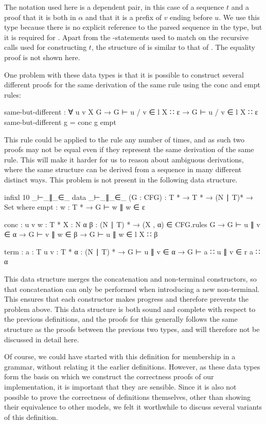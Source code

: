 	The  notation used here is a dependent pair, in this
	case of a sequence $t$ and a proof that it is both in $\alpha$ and that it
	is a prefix of $v$ ending before $u$. We use this type because there is no
	explicit reference to the parsed sequence in the  type,
	but it is required for . Apart from the
	-statements used to match on the recursive calls used for 
	constructing $t$, the structure of  is similar to that of
	. The equality proof  is not shown here.

	One problem with these data types is that it is possible to construct
	several different proofs for the same derivation of the same rule using the
	conc and empt rules:

	\begin{code}
		same-but-different : ∀ {u v X G} →
		  G ⊢ u / v ∈ l X ∷ ε →
		  G ⊢ u / v ∈ l X ∷ ε
		same-but-different g = conc g empt
	\end{code}

	This rule could be applied to the rule any number of times, and as such two
	proofs may not be equal even if they represent the same derivation of the
	same rule. This will make it harder for us to reason about ambiguous
	derivations, where the same structure can be derived from a sequence in
	many different distinct ways. This problem is not present in the following
	data structure.

	\begin{code}
		infixl 10 _⊢_∥_∈_
		data _⊢_∥_∈_ (G : CFG) : T * → T * → (N ∣ T)* → Set where
		  empt : {w : T *} →
		    G ⊢ w ∥ w ∈ ε

		  conc : {u v w : T *} {X : N} {α β : (N ∣ T) *} →
		    (X , α) ∈ CFG.rules G →
		    G ⊢ u ∥ v ∈ α →
		    G ⊢ v ∥ w ∈ β →
		      G ⊢ u ∥ w ∈ l X ∷ β

		  term : {a : T} {u v : T *} {α : (N ∣ T) *} →
		    G ⊢ u ∥ v ∈ α →
		      G ⊢ a ∷ u ∥ v ∈ r a ∷ α
	\end{code}
	
	This data structure merges the concatenation and non-terminal constructors,
	so that concatenation can only be performed when introducing a new
	non-terminal. This ensures that each constructor makes progress and
	therefore prevents the problem above. This data structure is both sound and
	complete with respect to the previous definitions, and the proofs for this
	generally follows the same structure as the proofs between the previous two
	types, and will therefore not be discussed in detail here.

	Of course, we could have started with this definition for membership in a
	grammar, without relating it the earlier definitions. However, as these
	data types form the basis on which we construct the correctness proofs of
	our implementation, it is important that they are sensible. Since it is
	also not possible to prove the correctness of definitions themselves, other
	than showing their equivalence to other models, we felt it worthwhile to
	discuss several variants of this definition.
